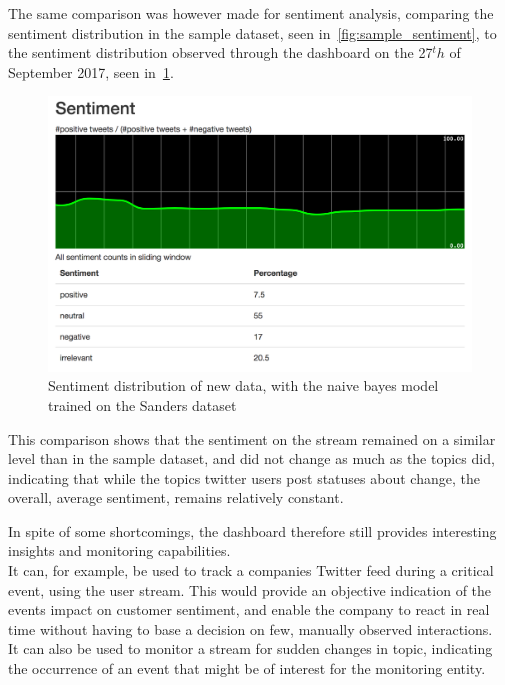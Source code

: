 The same comparison was however made for sentiment analysis, comparing the sentiment distribution in the sample dataset, seen in~\cref{fig:sample_sentiment},
to the sentiment distribution observed through the dashboard on the 27$^th$ of September 2017, seen in~\cref{fig:sample_sentiment_distribtion_new}.

\begin{figure}
    \centering
    \caption{Sentiment distribution of new data, with the naive bayes model trained on the Sanders dataset}
    \label{fig:sample_sentiment_distribtion_new}
    \includegraphics[width=\textwidth]{../images/dashboard_sentiment_sample.png}
\end{figure}

This comparison shows that the sentiment on the stream remained on a similar level than in the sample dataset,
and did not change as much as the topics did, indicating that while the topics twitter users post statuses about change,
the overall, average sentiment, remains relatively constant.

In spite of some shortcomings, the dashboard therefore still provides interesting insights and monitoring capabilities.\\
It can, for example, be used to track a companies Twitter feed during a critical event, using the user stream.
This would provide an objective indication of the events impact on customer sentiment,
and enable the company to react in real time without having to base a decision on few, manually observed interactions.\\
It can also be used to monitor a stream for sudden changes in topic,
indicating the occurrence of an event that might be of interest for the monitoring entity.